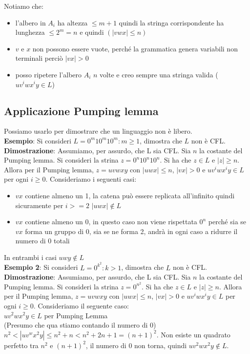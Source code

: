 \documentclass[12pt]{article}
\begin{document}
Notiamo che: 
\begin{itemize}
  \item l'albero in $A_i$ ha altezza $\leq m+1$ quindi la stringa corrispondente ha lunghezza $\leq 2^m = n$ e quindi $(|vwx| \leq n)$
  \item $v$ e $x$ non possono essere vuote, perché la grammatica genera variabili non terminali perciò $|vx| >0$
  \item posso ripetere l'albero $A_i$ $n$ volte e creo sempre una stringa valida ($uv^i wx^i y \in L$)
\end{itemize}

\subsection{Applicazione Pumping lemma}
Possiamo usarlo per dimostrare che un linguaggio non è libero.
\vspace{2mm}
\\ \textbf{Esempio}: Si consideri $L={0^m 10^m 10^m :m \geq 1}$, dimostra che $L$ non è CFL.
\\ \textbf{Dimostrazione}: Assumiamo, per assurdo, che L sia CFL. Sia $n$ la costante del Pumping lemma. Si consideri la strina $z=0^n 10^n 10^n$. Si ha che $z \in L$ e $|z| \geq n$. Allora per il Pumping lemma, $z=uvwxy$ con $|uwx| \leq n$, $|vx| >0$ e $uv^i wx^i y \in L$ per ogni $i \geq 0$. Consideriamo i seguenti casi: 
\begin{itemize}
  \item $vx$ contiene almeno un 1, la catena può essere replicata all'infinito quindi sicuramente per $i>=2$ $|uwx| \notin L$
  \item $vx$ contiene almeno un 0, in questo caso non viene rispettata $0^n$ perché sia se $vx$ forma un gruppo di 0, sia se ne forma 2, andrà in ogni caso a ridurre il numero di 0 totali
\end{itemize}
In entrambi i casi $uwy \notin L$
\vspace{2mm}
\\ \textbf{Esempio 2}: Si consideri $L={0^{k^2}:k>1}$, dimostra che $L$ non è CFL.
\\ \textbf{Dimostrazione}: Assumiamo, per assurdo, che L sia CFL. Sia $n$ la costante del Pumping lemma. Si consideri la strina $z=0^{n^2}$. Si ha che $z \in L$ e $|z| \geq n$. Allora per il Pumping lemma, $z=uvwxy$ con $|uwx| \leq n$, $|vx| >0$ e $uv^i wx^i y \in L$ per ogni $i \geq 0$. Consideriamo il seguente caso:
\\ $uv^2wx^2y \in L$ per Pumping Lemma
\\ (Presumo che qua stiamo contando il numero di 0) $n^2 < |uv^wx^2y| \leq n^2+n < n^2 + 2n + 1 = (n+1)^2$. Non esiste un quadrato perfetto tra $n^2$ e $(n+1)^2$, il numero di 0 non torna, quindi $uv^2wx^2y \notin L$.
\end{document}
